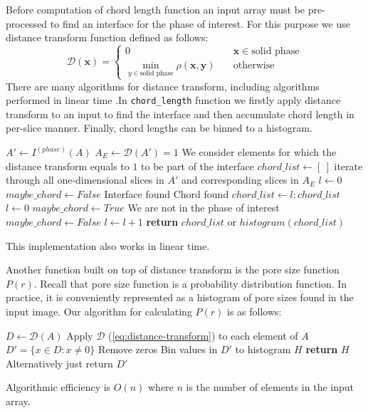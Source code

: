 \documentclass[1p]{elsarticle}
\newcommand{\code}[1]{\colorbox{light-gray}{\texttt{#1}}}
\begin{document}
Before computation of chord length function an input array must be pre-processed
to find an interface for the phase of interest. For this purpose we use
distance transform function defined as follows:
\begin{equation}
  \mathcal{D}(\bm{x})= \left\{
  \begin{array}{ll}
    0 & \quad \bm{x} \in \text{solid phase} \\
    \min\limits_{y \in \text{solid phase}} \rho(\bm{x},\bm{y}) & \quad \text{otherwise}
  \end{array}
\right. \label{eq:distance-transform}
\end{equation}
There are many algorithms for distance transform, including algorithms performed
in linear time \cite{DT}.In \code{chord\_length} function we firstly apply
distance transform to an input to find the interface and then accumulate chord
length in per-slice manner. Finally, chord lengths can be binned to a histogram.
\begin{algorithmic}[1]
    \State $A' \gets I^{(phase)}(A)$
    \State $A_E \gets \mathcal{D}(A') = 1$
    \Comment We consider elements for which the distance transform equals to $1$
    to be part of the interface
    \State $chord\_list \gets [\ ]$
      \Comment iterate through all one-dimensional slices in $A'$ and
      corresponding slices in $A_E$
      \State $l \gets 0$
      \State $maybe\_chord \gets False$
          \Comment Interface found
            \Comment Chord found
            \State $chord\_list \gets l:chord\_list$
          \EndIf
          \State $l \gets 0$
          \State $maybe\_chord \gets True$
          \Comment We are not in the phase of interest
          \State $maybe\_chord \gets False$
        \EndIf
        \State $l \gets l+1$
      \EndFor
    \EndFor
    \State \textbf{return} $chord\_list$ or $histogram(chord\_list)$
  \EndProcedure
\end{algorithmic}
This implementation also works in linear time.

Another function built on top of distance transform is the pore size function
$P(r)$. Recall that pore size function is a probability distribution
function. In practice, it is conveniently represented as a histogram of pore sizes
found in the input image. Our algorithm for calculating $P(r)$ is as follows:
\begin{algorithmic}[1]
    \State $D \gets \mathcal{D}(A)$
    \Comment Apply $\mathcal{D}$ (\cref{eq:distance-transform}) to each element of $A$
    \State $D' = \{ x \in D: x \ne 0\}$
    \Comment Remove zeros
    \State Bin values in $D'$ to histogram $H$
    \State \textbf{return} $H$
    \Comment Alternatively just return $D'$
  \EndProcedure
\end{algorithmic}
Algorithmic efficiency is $O(n)$ where $n$ is the number of elements in the
input array.
\end{document}

